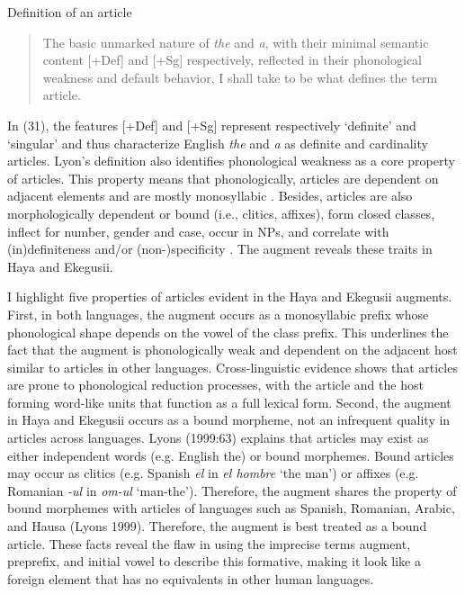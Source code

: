 \documentclass[output=paper]{langscibook}
\begin{document}
\begin{exe}
\ex Definition of an article 
\label{31}
\begin{quote}
    The basic unmarked nature of \textit{the} and \textit{a}, with their minimal semantic content [+Def] and [+Sg] respectively, reflected in their phonological weakness and default behavior, I shall take to be what defines the term article.
\end{quote}
\end{exe}
In (31), the features [+Def] and [+Sg] represent respectively ‘definite’ and ‘singular’ and thus characterize English \textit{the} and \textit{a} as definite and cardinality articles. Lyon’s definition also identifies phonological weakness as a core property of articles. This property means that phonologically, articles are dependent on adjacent elements and are mostly monosyllabic \citep{giusti1997categorial}. Besides, articles are also morphologically dependent or bound (i.e., clitics, affixes), form closed classes, inflect for number, gender and case, occur in NPs, and correlate with (in)definiteness and/or (non-)specificity \citep{giusti1997categorial}. The augment reveals these traits in Haya and Ekegusii.

I highlight five properties of articles evident in the Haya and Ekegusii augments. First, in both languages, the augment occurs as a monosyllabic prefix whose phonological shape depends on the vowel of the class prefix. This underlines the fact that the augment is phonologically weak and dependent on the adjacent host similar to articles in other languages. Cross-linguistic evidence shows that articles are prone to phonological reduction processes, with the article and the host forming word-like units that function as a full lexical form. Second, the augment in Haya and Ekegusii occurs as a bound morpheme, not an infrequent quality in articles across languages. Lyons (1999:63) explains that articles may exist as either independent words (e.g. English the) or bound morphemes. Bound articles may occur as clitics (e.g. Spanish \textit{el} in \textit{el hombre} ‘the man’) or affixes (e.g. Romanian \textit{-ul} in \textit{om-ul} ‘man-the’). Therefore, the augment shares the property of bound morphemes with articles of languages such as Spanish, Romanian, Arabic, and Hausa (Lyons 1999). Therefore, the augment is best treated as a bound article. These facts reveal the flaw in using the imprecise terms augment, preprefix, and initial vowel to describe this formative, making it look like a foreign element that has no equivalents in other human languages.
	
\end{document}
